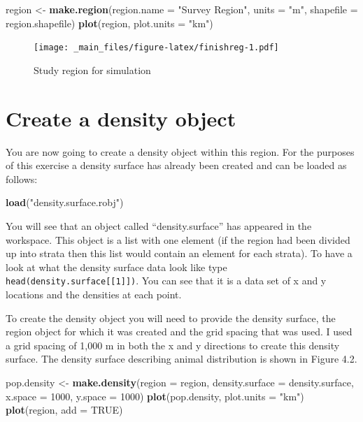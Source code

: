 \documentclass[]{book}
\newenvironment{Shaded}{\begin{snugshade}}{\end{snugshade}}
\newcommand{\KeywordTok}[1]{\textcolor[rgb]{0.13,0.29,0.53}{\textbf{#1}}}
\newcommand{\DataTypeTok}[1]{\textcolor[rgb]{0.13,0.29,0.53}{#1}}
\newcommand{\DecValTok}[1]{\textcolor[rgb]{0.00,0.00,0.81}{#1}}
\newcommand{\StringTok}[1]{\textcolor[rgb]{0.31,0.60,0.02}{#1}}
\newcommand{\OtherTok}[1]{\textcolor[rgb]{0.56,0.35,0.01}{#1}}
\newcommand{\NormalTok}[1]{#1}
\theoremstyle{definition}
\theoremstyle{definition}
\theoremstyle{remark}
\begin{document}
\begin{Shaded}
\begin{Highlighting}[]
\NormalTok{region <-}\StringTok{ }\KeywordTok{make.region}\NormalTok{(}\DataTypeTok{region.name =} \StringTok{"Survey Region"}\NormalTok{, }\DataTypeTok{units =} \StringTok{"m"}\NormalTok{, }
                      \DataTypeTok{shapefile =}\NormalTok{ region.shapefile)}
\KeywordTok{plot}\NormalTok{(region, }\DataTypeTok{plot.units =} \StringTok{"km"}\NormalTok{)}
\end{Highlighting}
\end{Shaded}

\begin{figure}
\centering
\texttt{[image: \_main\_files/figure-latex/finishreg-1.pdf]}
\caption{\label{fig:finishreg}Study region for simulation}
\end{figure}

\section{Create a density object}\label{create-a-density-object}

You are now going to create a density object within this region. For the
purposes of this exercise a density surface has already been created and
can be loaded as follows:

\begin{Shaded}
\begin{Highlighting}[]
\KeywordTok{load}\NormalTok{(}\StringTok{"density.surface.robj"}\NormalTok{)}
\end{Highlighting}
\end{Shaded}

You will see that an object called ``density.surface'' has appeared in
the workspace. This object is a list with one element (if the region had
been divided up into strata then this list would contain an element for
each strata). To have a look at what the density surface data look like
type \texttt{head(density.surface{[}{[}1{]}{]})}. You can see that it is
a data set of x and y locations and the densities at each point.

To create the density object you will need to provide the density
surface, the region object for which it was created and the grid spacing
that was used. I used a grid spacing of 1,000 m in both the x and y
directions to create this density surface. The density surface
describing animal distribution is shown in Figure 4.2.

\begin{Shaded}
\begin{Highlighting}[]
\NormalTok{pop.density <-}\StringTok{ }\KeywordTok{make.density}\NormalTok{(}\DataTypeTok{region =}\NormalTok{ region, }\DataTypeTok{density.surface =}\NormalTok{ density.surface, }
                            \DataTypeTok{x.space =} \DecValTok{1000}\NormalTok{, }\DataTypeTok{y.space =} \DecValTok{1000}\NormalTok{) }
\KeywordTok{plot}\NormalTok{(pop.density, }\DataTypeTok{plot.units =} \StringTok{"km"}\NormalTok{)}
\KeywordTok{plot}\NormalTok{(region, }\DataTypeTok{add =} \OtherTok{TRUE}\NormalTok{)}
\end{Highlighting}
\end{Shaded}
\end{document}
